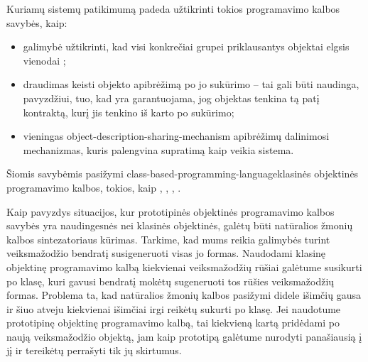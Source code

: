 Kuriamų sistemų patikimumą padeda užtikrinti tokios programavimo
kalbos savybės, kaip:
\begin{itemize}
  \item galimybė užtikrinti, kad visi konkrečiai grupei priklausantys
    objektai elgsis vienodai ;
  \item draudimas keisti objekto apibrėžimą po jo sukūrimo – tai
    gali būti naudinga, pavyzdžiui, tuo, kad yra garantuojama,
    jog objektas tenkina tą patį kontraktą, kurį jis tenkino iš
    karto po sukūrimo;
  \item vieningas \gls{object-description-sharing-mechanism}{
    apibrėžimų dalinimosi mechanizmas}, kuris palengvina supratimą
    kaip veikia sistema.
\end{itemize}
Šiomis savybėmis pasižymi
\gls{class-based-programming-language}{klasinės objektinės
programavimo kalbos}, tokios, kaip , ,
, .

Kaip pavyzdys situacijos, kur prototipinės objektinės programavimo
kalbos savybės yra naudingesnės nei klasinės objektinės, galėtų
būti natūralios žmonių kalbos sintezatoriaus kūrimas. Tarkime, kad
mums reikia galimybės turint veiksmažodžio bendratį susigeneruoti
visas jo formas. Naudodami klasinę objektinę programavimo kalbą
kiekvienai veiksmažodžių rūšiai galėtume susikurti po klasę,
kuri gavusi bendratį mokėtų sugeneruoti tos rūšies veiksmažodžių
formas. Problema ta, kad natūralios žmonių kalbos pasižymi didele
išimčių gausa ir šiuo atveju kiekvienai išimčiai irgi reikėtų
sukurti po klasę. Jei naudotume prototipinę objektinę programavimo
kalbą, tai kiekvieną kartą pridėdami po naują veiksmažodžio
objektą, jam kaip prototipą galėtume nurodyti panašiausią į jį ir
tereikėtų perrašyti tik jų skirtumus.

